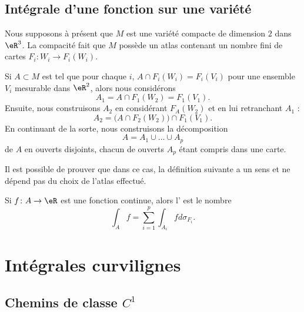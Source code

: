 \subsection{Intégrale d'une fonction sur une variété}

Nous supposons à présent que $M$ est une variété compacte de dimension $2$ dans $\eR^3$. La compacité fait que $M$ possède un atlas contenant un nombre fini de cartes $F_i\colon W_i\to F_i(W_i)$. 

Si $A\subset M$ est tel que pour chaque $i$, $A\cap F_i(W_i)=F_i(V_i)$ pour une ensemble $V_i$ mesurable dans $\eR^2$, alors nous considérons
\begin{equation}
	A_1=A\cap F_1(W_2)=F_1(V_1).
\end{equation}
Ensuite, nous construisons $A_2$ en considérant $F_A(W_2)$ et en lui retranchant $A_1$ :
\begin{equation}
	A_2=\big( A\cap F_2(W_2) \big)\cap F_1(V_1).
\end{equation}
En continuant de la sorte, nous construisons la décomposition
\begin{equation}
	A=A_1\cup\ldots\cup A_p
\end{equation}
de $A$ en ouverts disjoints, chacun de ouverts $A_p$ étant compris dans une carte.

Il est possible de prouver que dans ce cas, la définition suivante a un sens et ne dépend pas du choix de l'atlas effectué.
\begin{definition}
	Si $f\colon A\to \eR$ est une fonction continue, alors l' est le nombre
	\begin{equation}
		\int_Af=\sum_{i=1}^p\int_{A_i}fd\sigma_{F_i}.
	\end{equation}
\end{definition}

\section{Intégrales curvilignes}
\label{secintcurvi}

\subsection{Chemins de classe \texorpdfstring{$C^1$}{C1}}

